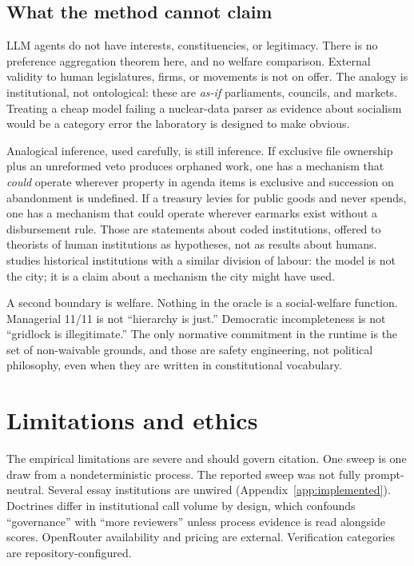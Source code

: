 \documentclass[11pt,a4paper]{article}
\begin{document}
\subsection{What the method cannot claim}

LLM agents do not have interests, constituencies, or legitimacy. There is no preference
aggregation theorem here, and no welfare comparison. External validity to human
legislatures, firms, or movements is not on offer. The analogy is institutional, not
ontological: these are \emph{as-if} parliaments, councils, and markets. Treating a
cheap model failing a nuclear-data parser as evidence about socialism would be a category
error the laboratory is designed to make obvious.

Analogical inference, used carefully, is still inference. If exclusive file ownership
plus an unreformed veto produces orphaned work, one has a mechanism that
\emph{could} operate wherever property in agenda items is exclusive and succession on
abandonment is undefined. If a treasury levies for public goods and never spends, one
has a mechanism that could operate wherever earmarks exist without a disbursement rule.
Those are statements about coded institutions, offered to theorists of human institutions
as hypotheses, not as results about humans. \citet{greif2006} studies historical
institutions with a similar division of labour: the model is not the city; it is a claim
about a mechanism the city might have used.

A second boundary is welfare. Nothing in the oracle is a social-welfare function.
Managerial 11/11 is not ``hierarchy is just.'' Democratic incompleteness is not
``gridlock is illegitimate.'' The only normative commitment in the runtime is the set of
non-waivable grounds, and those are safety engineering, not political philosophy, even
when they are written in constitutional vocabulary.

\section{Limitations and ethics}
\label{sec:limits}

The empirical limitations are severe and should govern citation. One sweep is one draw
from a nondeterministic process. The reported sweep was not fully prompt-neutral. Several
essay institutions are unwired (Appendix~\ref{app:implemented}). Doctrines differ in
institutional call volume by design, which confounds ``governance'' with ``more
reviewers'' unless process evidence is read alongside scores. OpenRouter availability
and pricing are external. Verification categories are repository-configured.
\end{document}

